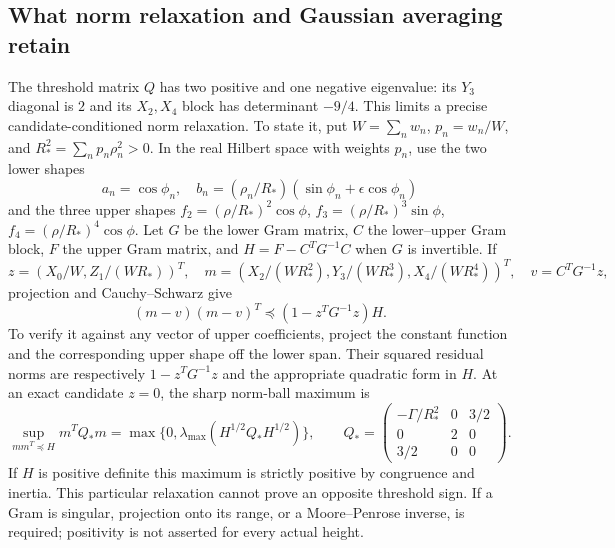 \documentclass[11pt]{article}
\numberwithin{equation}{section}
\theoremstyle{definition}
\theoremstyle{remark}
\begin{document}
\subsection{What norm relaxation and Gaussian averaging retain}
\label{fo:relaxations}
The threshold matrix $Q$ has two positive and one negative eigenvalue:
its $Y_3$ diagonal is $2$ and its $X_2,X_4$ block has determinant
$-9/4$.  This limits a precise candidate-conditioned norm relaxation.
To state it, put $W=\sum_nw_n$, $p_n=w_n/W$, and
$R_*^2=\sum_np_n\rho_n^2>0$.  In the real Hilbert space with weights
$p_n$, use the two lower shapes
\begin{equation}
a_n=\cos\phi_n,\quad
b_n=(\rho_n/R_*)(\sin\phi_n+\epsilon\cos\phi_n)
\end{equation}
and the three upper shapes
$f_2=(\rho/R_*)^2\cos\phi$,
$f_3=(\rho/R_*)^3\sin\phi$,
$f_4=(\rho/R_*)^4\cos\phi$.  Let $G$ be the lower Gram matrix,
$C$ the lower--upper Gram block, $F$ the upper Gram matrix, and
$H=F-C^TG^{-1}C$ when $G$ is invertible.  If
\begin{equation}
z=\left(X_0/W,Z_1/(WR_*)\right)^T,\quad
m=\left(X_2/(WR_*^2),Y_3/(WR_*^3),X_4/(WR_*^4)\right)^T,
\quad v=C^TG^{-1}z,
\end{equation}
projection and Cauchy--Schwarz give
\begin{equation}
(m-v)(m-v)^T\preceq(1-z^TG^{-1}z)H.
\label{fo:Gram-relaxation}
\end{equation}
To verify it against any vector of upper coefficients, project the
constant function and the corresponding upper shape off the lower
span.  Their squared residual norms are respectively
$1-z^TG^{-1}z$ and the appropriate quadratic form in $H$.
At an exact candidate $z=0$, the sharp norm-ball maximum is
\begin{equation}
\sup_{mm^T\preceq H}m^TQ_*m
 =\max\{0,\lambda_{\max}(H^{1/2}Q_*H^{1/2})\},\qquad
Q_*=\begin{pmatrix}-\Gamma/R_*^2&0&3/2\\0&2&0\\3/2&0&0\end{pmatrix}.
\label{fo:relaxation-maximum}
\end{equation}
If $H$ is positive definite this maximum is strictly positive by
congruence and inertia.  This particular relaxation cannot prove an
opposite threshold sign.  If a Gram is singular, projection onto its
range, or a Moore--Penrose inverse, is required; positivity is not
asserted for every actual height.
\end{document}
